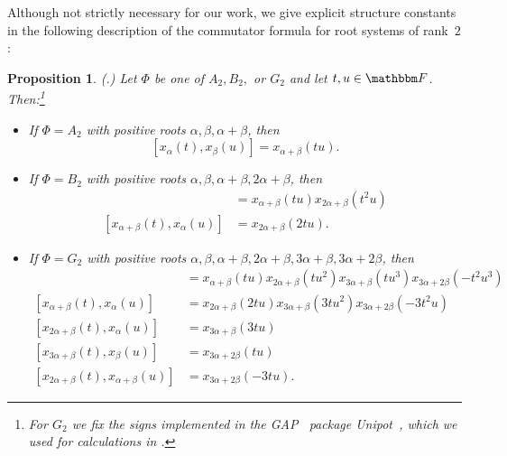 \documentclass[10pt,a4paper]{article}
\newtheorem{proposition}[theorem]{Proposition}
\theoremstyle{definition}
\newtheorem{definition}[theorem]{Definition}
\newcommand{\F}{\mathbbm F}
\newcommand{\la}{\langle}
\newcommand{\ra}{\rangle}
\newcommand{\rnote}[1]{}
\begin{document}
Although  not strictly necessary for our work, we give explicit structure constants in the following description of the commutator formula for root systems of rank~$2$:
\begin{proposition}\label{rk2com}
    \textnormal{(\cite[Sec.~33.3--33.5]{Hum95}.)}
    Let $\Phi$ be one of $A_2,B_2,$ or $G_2$ and let $t,u \in \F$. Then:\footnote{For $G_2$ we fix the signs implemented in the GAP~\cite{GAP4} package Unipot~\cite{HH18}, which we used for calculations in .}
    \begin{itemize}
        \item If $\Phi = A_2$ with positive roots $\alpha,\beta, \alpha+\beta$, then
        \[[x_\alpha(t),x_\beta(u)] = x_{\alpha + \beta}(tu).\]
        \item If $\Phi = B_2$ with positive roots $\alpha,\beta,\alpha+\beta,2\alpha+\beta$, then
        \begin{align*}
        [x_\beta(t),x_\alpha(u)] &= x_{\alpha + \beta}(tu)x_{2\alpha+\beta}(t^2u)\\
        [x_{\alpha+\beta}(t),x_\alpha(u)] &= x_{2\alpha+\beta}(2tu).
        \end{align*}
        \item If $\Phi = G_2$ with positive roots $\alpha,\beta,\alpha+\beta,2\alpha+\beta,3\alpha+\beta,3\alpha+2\beta$, then
        \begin{align*}
        [x_\beta(t),x_\alpha(u)] &= x_{\alpha+\beta}(tu)x_{2\alpha+\beta}(tu^2)x_{3\alpha+\beta}(tu^3)x_{3\alpha+2\beta}(-t^2u^3) \\
        [x_{\alpha+\beta}(t),x_{\alpha}(u)] &= x_{2\alpha+\beta}(2tu)x_{3\alpha+\beta}(3tu^2)x_{3\alpha+2\beta}(-3t^2u)\\
        [x_{2\alpha+\beta}(t),x_{\alpha}(u)] &= x_{3\alpha+\beta}(3tu)\\
        [x_{3\alpha+\beta}(t),x_{\beta}(u)] &= x_{3\alpha+2\beta}(tu) \\
        [x_{2\alpha+\beta}(t),x_{\alpha+\beta}(u)] &= x_{3\alpha+2\beta}(-3tu).
        \end{align*}
        \end{itemize}
\end{proposition}

\end{document}
